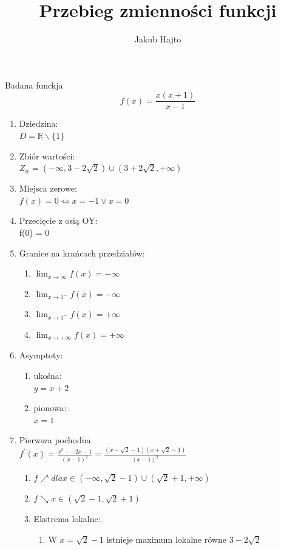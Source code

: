 \documentclass[11pt]{scrartcl}
\title{Przebieg zmienności funkcji}
\author{Jakub Hajto}
\begin{document}
	\maketitle
	\begin{center}
	Badana funckja $$ f(x) = \frac{x(x+1)}{x-1} $$
	\end{center}
	\begin{enumerate}
		\item Dziedzina: \\
			$ D = \mathbb{R} \backslash \{1\} $
		\item Zbiór wartości: \\
			$ Z_w = (-\infty, 3 - 2\sqrt{2}) \cup (3 + 2\sqrt{2}, + \infty) $
		\item Miejsca zerowe: \\
			$ f(x) = 0 \Longleftrightarrow x = -1 \vee x = 0 $
		\item Przecięcie z osią OY: \\
			f(0) = 0
		\item Granice na krańcach przedziałów:
			\begin{enumerate}
				\item $ \lim_{x\to\infty} f(x) = -\infty $
				\item $ \lim_{x\to1^-} f(x) = -\infty $
				\item $ \lim_{x\to1^-} f(x) = +\infty $
				\item $ \lim_{x\to+\infty} f(x) = +\infty $
			\end{enumerate}
		\item Asymptoty:
			\begin{enumerate}
				\item ukośna: \\
					$ y = x + 2$
				\item pionowa: \\
					$ x=1 $
			\end{enumerate}
		\item Pierwsza pochodna \\
			$ f^{\prime}(x) = \frac{x^2 - -2x -1}{(x-1)^2} =  \frac{(x- \sqrt{2} - 1)(x + \sqrt{2} - 1)}{(x-1)^2} $
			\begin{enumerate}
				\item $ f\nearrow dla x \in (-\infty, \sqrt{2} -1) \cup (\sqrt{2} +1, +\infty) $
				\item $ f\searrow x \in ( \sqrt{2} - 1, \sqrt{2} +1 ) $
				\item Ekstrema lokalne:
					\begin{enumerate}
						\item W $ x = \sqrt{2} -1 $ istnieje maximum lokalne równe $ 3 - 2\sqrt{2} $

\end{enumerate}
\end{enumerate}
\end{enumerate}
\end{document}
